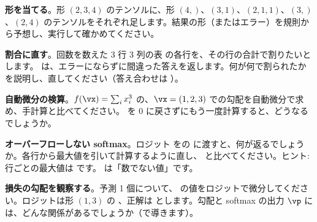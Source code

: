 \begin{exercises}
\item \textbf{形を当てる}。形 $(2,3,4)$ のテンソルに、形 $(4,)$、$(3,1)$、$(2,1,1)$、$(3,)$、$(2,4)$ のテンソルをそれぞれ足します。結果の形（またはエラー）を規則から予想し、実行して確かめてください。
\item \textbf{割合に直す}。回数を数えた 3 行 3 列の表  の各行を、その行の合計で割りたいとします。 は、エラーにならずに間違った答えを返します。何が何で割られたかを説明し、直してください（答え合わせは ）。
\item \textbf{自動微分の検算}。$f(\vx)=\sum_{i}x_i^{3}$ の、$\vx=(1,2,3)$ での勾配を自動微分で求め、手計算と比べてください。 を 0 に戻さずにもう一度計算すると、どうなるでしょうか。
\item \textbf{オーバーフローしない softmax}。ロジット  をの  に渡すと、何が返るでしょうか。各行から最大値を引いて計算するように直し、 と比べてください。ヒント: 行ごとの最大値は  です。 は「数でない値」です。
\item \textbf{損失の勾配を観察する}。予測 1 個について、 の値をロジットで微分してください。ロジットは形 $(1,3)$ の \code{[[2.0, 1.0, 0.0]]}、正解は  とします。勾配と softmax の出力 $\vp$ には、どんな関係があるでしょうか（で導きます）。
\end{exercises}
